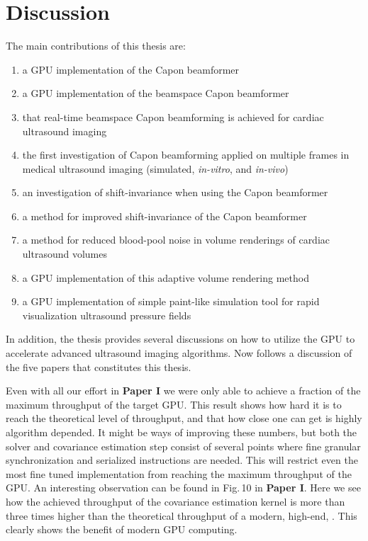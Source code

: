 \section{Discussion}
The main contributions of this thesis are:
\begin{enumerate}
\item a GPU implementation of the Capon beamformer
\item a GPU implementation of the beamspace Capon beamformer
\item that real-time beamspace Capon beamforming is achieved for cardiac ultrasound imaging
\item the first investigation of Capon beamforming applied on multiple frames in medical ultrasound imaging (simulated, \textit{in-vitro}, and \textit{in-vivo})
\item an investigation of shift-invariance when using the Capon beamformer
\item a method for improved shift-invariance of the Capon beamformer
\item a method for reduced blood-pool noise in volume renderings of cardiac ultrasound volumes
\item a GPU implementation of this adaptive volume rendering method
\item a GPU implementation of simple paint-like simulation tool for rapid visualization ultrasound pressure fields
\end{enumerate}

In addition, the thesis provides several discussions on how to utilize the GPU to accelerate advanced ultrasound imaging algorithms. Now follows a discussion of the five papers that constitutes this thesis.

Even with all our effort in \textbf{Paper I} we were only able to achieve a fraction of the maximum throughput of the target GPU. This result shows how hard it is to reach the theoretical level of throughput, and that how close one can get is highly algorithm depended. It might be ways of improving these numbers, but both the solver and covariance estimation step consist of several points where fine granular synchronization and serialized instructions are needed. This will restrict even the most fine tuned implementation from reaching the maximum throughput of the GPU. An interesting observation can be found in Fig.\,10 in \textbf{Paper I}. Here we see how the achieved throughput of the covariance estimation kernel is more than three times higher than the theoretical throughput of a modern, high-end, . This clearly shows the benefit of modern GPU computing. 

